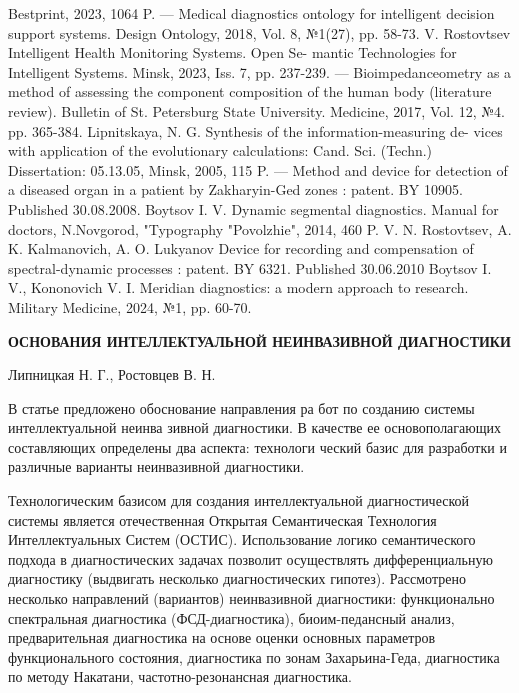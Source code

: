 \documentclass[10pt, a4paper]{article}
\begin{document}
\begin{multicols}{2}
\begin{thebibliography}{21}
Bestprint, 2023, 1064 P.
     — Medical diagnostics ontology for intelligent decision support
systems. Design Ontology, 2018, Vol. 8, №1(27), pp. 58-73.
     V. Rostovtsev Intelligent Health Monitoring Systems. Open Se-
mantic Technologies for Intelligent Systems. Minsk, 2023, Iss. 7,
pp. 237-239.
     — Bioimpedanceometry as a method of assessing the component
composition of the human body (literature review). Bulletin of
St. Petersburg State University. Medicine, 2017, Vol. 12, №4.
pp. 365-384.
    Lipnitskaya, N. G. Synthesis of the information-measuring de-
vices with application of the evolutionary calculations: Cand. Sci.
(Techn.) Dissertation: 05.13.05, Minsk, 2005, 115 P.
     — Method and device for detection of a diseased organ in a
patient by Zakharyin-Ged zones : patent. BY 10905. Published
30.08.2008.
    Boytsov I. V. Dynamic segmental diagnostics. Manual for doctors,
N.Novgorod, "Typography "Povolzhie", 2014, 460 P.
    V. N. Rostovtsev, A. K. Kalmanovich, A. O. Lukyanov Device
for recording and compensation of spectral-dynamic processes :
patent. BY 6321. Published 30.06.2010
    Boytsov I. V., Kononovich V. I. Meridian diagnostics: a modern
approach to research. Military Medicine, 2024, №1, pp. 60-70.
\end{thebibliography}


\setlength{\parindent}{0.8cm}
\par
\setlength{\parindent}{0.3cm}
\fontsize{10}{15}\selectfont
{}
\begin{center}
\normalsize{\textbf{ОСНОВАНИЯ ИНТЕЛЛЕКТУАЛЬНОЙ
НЕИНВАЗИВНОЙ ДИАГНОСТИКИ}}
\fontsize{12}{15}\selectfont
\par Липницкая Н. Г., Ростовцев В. Н.
\end{center}
\fontsize{10}{13}\selectfont
\par В статье предложено обоснование направления ра
бот по созданию системы интеллектуальной неинва
зивной диагностики. В качестве ее основополагающих
составляющих определены два аспекта: технологи
ческий базис для разработки и различные варианты
неинвазивной диагностики.
\par Технологическим базисом для создания интеллектуальной диагностической системы является отечественная Открытая Семантическая Технология Интеллектуальных Систем (ОСТИС). Использование логико
семантического подхода в диагностических задачах позволит осуществлять дифференциальную диагностику (выдвигать несколько диагностических гипотез). Рассмотрено несколько направлений (вариантов) неинвазивной диагностики: функционально
спектральная диагностика (ФСД-диагностика), биоим-педансный анализ, предварительная диагностика на
основе оценки основных параметров функционального
состояния, диагностика по зонам Захарьина-Геда, диагностика по методу Накатани, частотно-резонансная
диагностика.


\end{multicols}
\end{document}
